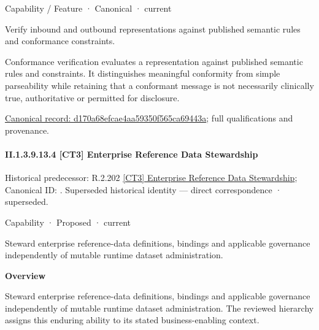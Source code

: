 \label{element:d170a68efcae4aa59350f565ca69443a}
{\small Capability / Feature · Canonical · current}\par

Verify inbound and outbound representations against published semantic rules and conformance constraints.



Conformance verification evaluates a representation against published semantic rules and constraints. It distinguishes meaningful conformity from simple parseability while retaining that a conformant message is not necessarily clinically true, authoritative or permitted for disclosure.


{\footnotesize \href{../../../../../../../continuum/strategy/capability/feature/d170a68efcae4aa59350f565ca69443a.md}{Canonical record: d170a68efcae4aa59350f565ca69443a}; full qualifications and provenance.}\par
\paragraph*{II.1.3.9.13.4 [CT3] Enterprise Reference Data Stewardship}
\label{navigation:II.1.3.9.13.4}

{\small Historical predecessor: R.2.202 \hyperref[element:fd9f3239fdb64ea687825b66bb4d1f17]{[CT3] Enterprise Reference Data Stewardship}; Canonical ID: \texttt{}. Superseded historical identity — direct correspondence · superseded.}\par
\label{element:971d4b079ad24e89b70a8ed8dec0c8bf}
{\small Capability · Proposed · current}\par

Steward enterprise reference-data definitions, bindings and applicable governance independently of mutable runtime dataset administration.



\textbf{Overview}



Steward enterprise reference-data definitions, bindings and applicable governance independently of mutable runtime dataset administration. The reviewed hierarchy assigns this enduring ability to its stated business-enabling context.




